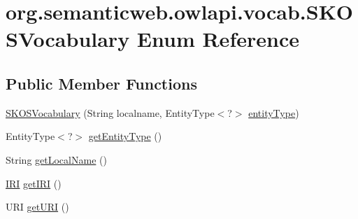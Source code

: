 \hypertarget{enumorg_1_1semanticweb_1_1owlapi_1_1vocab_1_1_s_k_o_s_vocabulary}{\section{org.\-semanticweb.\-owlapi.\-vocab.\-S\-K\-O\-S\-Vocabulary Enum Reference}
\label{enumorg_1_1semanticweb_1_1owlapi_1_1vocab_1_1_s_k_o_s_vocabulary}
}
\subsection*{Public Member Functions}
\begin{DoxyCompactItemize}
\item 
\hyperlink{enumorg_1_1semanticweb_1_1owlapi_1_1vocab_1_1_s_k_o_s_vocabulary_a76df377d9d8df319460622cb19b3a658}{S\-K\-O\-S\-Vocabulary} (String localname, Entity\-Type$<$?$>$ \hyperlink{enumorg_1_1semanticweb_1_1owlapi_1_1vocab_1_1_s_k_o_s_vocabulary_a94213c33824b92739adb968600ab7d3a}{entity\-Type})
\item 
Entity\-Type$<$?$>$ \hyperlink{enumorg_1_1semanticweb_1_1owlapi_1_1vocab_1_1_s_k_o_s_vocabulary_ae49a3bf15347a9d5fac20060647b43e1}{get\-Entity\-Type} ()
\item 
String \hyperlink{enumorg_1_1semanticweb_1_1owlapi_1_1vocab_1_1_s_k_o_s_vocabulary_ac129acbd2b761a214fd2a3714f678b52}{get\-Local\-Name} ()
\item 
\hyperlink{classorg_1_1semanticweb_1_1owlapi_1_1model_1_1_i_r_i}{I\-R\-I} \hyperlink{enumorg_1_1semanticweb_1_1owlapi_1_1vocab_1_1_s_k_o_s_vocabulary_a5ac42d5a47557abd0465eb1131de91af}{get\-I\-R\-I} ()
\item 
U\-R\-I \hyperlink{enumorg_1_1semanticweb_1_1owlapi_1_1vocab_1_1_s_k_o_s_vocabulary_acd5e5d178fc0153c1b8ac37ad25c6d80}{get\-U\-R\-I} ()
\end{DoxyCompactItemize}
